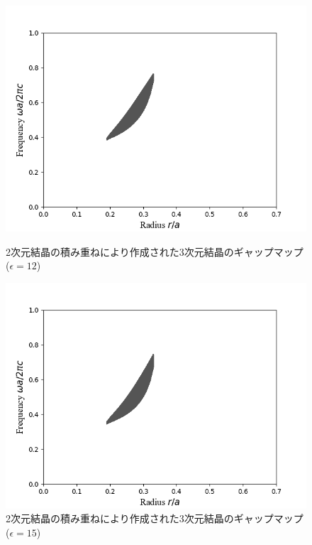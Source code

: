 \documentclass[platex,dvipdfmx]{jsreport}
\numberwithin{equation}{section}
\begin{document}
\begin{figure}[h]
  \begin{minipage}[h]{0.5\linewidth}
    \centering
    \includegraphics[keepaspectratio, scale=0.45]{results/gap_map/stack_e-12.png}
    \caption{2次元結晶の積み重ねにより作成された3次元結晶のギャップマップ($\epsilon = 12$)}
    \label{fig:gapmap_stack_e-13}
  \end{minipage}
  \begin{minipage}[h]{0.5\linewidth}
    \centering
    \includegraphics[keepaspectratio, scale=0.45]{results/gap_map/stack_e-15.png}
    \caption{2次元結晶の積み重ねにより作成された3次元結晶のギャップマップ($\epsilon = 15$)}
    \label{fig:gapmap_stack_e-15}
  \end{minipage}
\end{figure}
\end{document}
